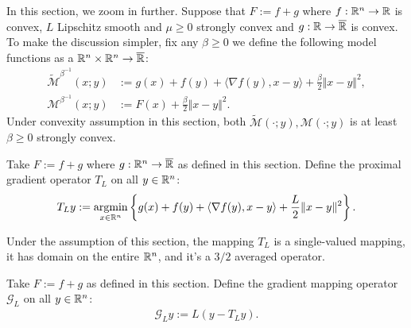 \documentclass[12pt]{article}
\begin{document}
            In this section, we zoom in further. 
            Suppose that $F:= f + g$ where $f:\mathbb R^n \rightarrow \mathbb R$ is convex, $L$ Lipschitz smooth and $\mu \ge 0$ strongly convex and $g: \mathbb R\rightarrow \overline {\mathbb R}$ is convex. 
            To make the discussion simpler, fix any $\beta \ge 0$ we define the following model functions as a $\mathbb R^n \times \mathbb R^n \rightarrow \overline {\mathbb R}$: 
            \begin{align*}
                \widetilde{\mathcal M}^{\beta^{-1}}
                (x; y)
                &:= 
                g(x) + f(y) + \langle \nabla f(y), x - y\rangle
                + \frac{\beta}{2}\Vert x - y\Vert^2,
                \\
                \mathcal M^{\beta^{-1}}(x; y) 
                &:= F(x) + \frac{\beta}{2}\Vert x - y\Vert^2.
            \end{align*}
            Under convexity assumption in this section, both $\widetilde {\mathcal M} (\cdot; y),  {\mathcal M}(\cdot;y )$ is at least $\beta \ge 0$ strongly convex. 
            \begin{definition}\label{def:proximal-gradient-operator}
                Take $F := f + g$ where $g: \mathbb R^n \rightarrow \overline {\mathbb R}$ as defined in this section. 
                Define the proximal gradient operator $T_L$ on all $y \in \mathbb R^n$: 
                \begin{align*}
                    T_L y := \mathop{\rm argmin}\limits_{x \in \mathbb R^n} \left\lbrace
                        g(x) + f(y) + \langle \nabla f(y), x - y\rangle 
                        + \frac{L}{2}\Vert x- y \Vert^2
                    \right\rbrace. 
                \end{align*}
            \end{definition}
            \begin{remark}
                Under the assumption of this section, the mapping $T_L$ is a single-valued mapping, it has domain on the entire $\mathbb R^n$, and it's a $3/2$ averaged operator. 
            \end{remark}
            \begin{definition}\label{def:gradient-mapping-operator}
                Take $F := f + g$ as defined in this section. 
                Define the gradient mapping operator $\mathcal G_L$ on all $y \in \mathbb R^n$: 
                \begin{align*}
                    \mathcal G_L y:= L(y - T_L y). 
                \end{align*}
            \end{definition}
\end{document}
